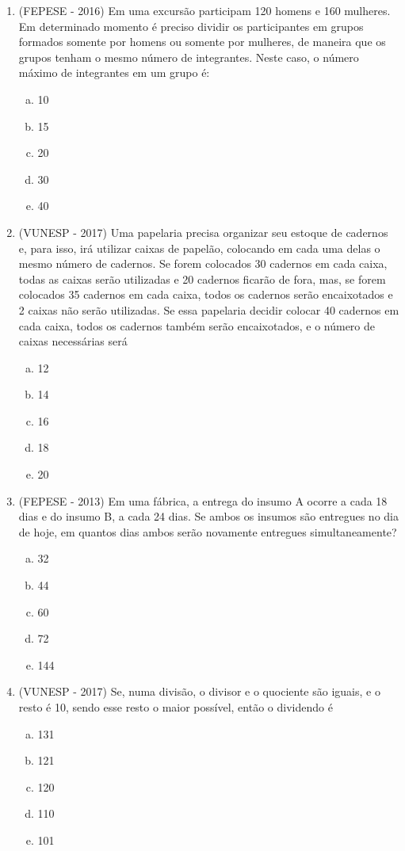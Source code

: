 \begin{enumerate}
  
  \item (FEPESE - 2016) Em uma excursão participam 120 homens e 160 mulheres. Em determinado momento é preciso dividir os participantes em grupos formados somente por homens ou somente por mulheres, de maneira que os grupos tenham o mesmo número de integrantes. Neste caso, o número máximo de integrantes em um grupo é:
  \begin{enumerate}[a)]
  \item 10
  \item 15
  \item 20
  \item 30
  \item 40
  \end{enumerate}

  
  \item (VUNESP - 2017) Uma papelaria precisa organizar seu estoque de cadernos e, para isso, irá utilizar caixas de papelão, colocando em cada uma delas o mesmo número de cadernos. Se forem colocados 30 cadernos em cada caixa, todas as caixas serão utilizadas e 20 cadernos ficarão de fora, mas, se forem colocados 35 cadernos em cada caixa, todos os cadernos serão encaixotados e 2 caixas não serão utilizadas. Se essa papelaria decidir colocar 40 cadernos em cada caixa, todos os cadernos também serão encaixotados, e o número de caixas necessárias será
  \begin{enumerate}[a)]
  \item 12
  \item 14
  \item 16
  \item 18
  \item 20
  \end{enumerate}

  
   \item (FEPESE - 2013) Em uma fábrica, a entrega do insumo A ocorre a cada 18 dias e do insumo B, a cada 24 dias. Se ambos os insumos são entregues no dia de hoje, em quantos dias ambos serão novamente entregues simultaneamente?
  \begin{enumerate}[a)]
  \item 32
  \item 44
  \item 60
  \item 72
  \item 144
  \end{enumerate}

  
  \item (VUNESP - 2017) Se, numa divisão, o divisor e o quociente são iguais, e o resto é 10, sendo esse resto o maior possível, então o dividendo é
  \begin{enumerate}[a)]
  \item 131
  \item 121
  \item 120
  \item 110
  \item 101
  \end{enumerate}


\end{enumerate}
